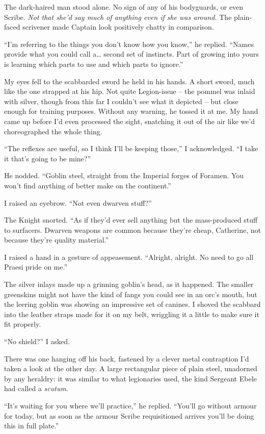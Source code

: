 \documentclass[12pt, openany]{book}
\begin{document}
The dark-haired man stood alone. No sign of any of his bodyguards, or even Scribe. \textit{Not that she’d say much of anything even if she was around.} The plain-faced scrivener made Captain look positively chatty in comparison.

“I’m referring to the things you don’t know how you know,” he replied. “Names provide what you could call a… second set of instincts. Part of growing into yours is learning which parts to use and which parts to ignore.”

My eyes fell to the scabbarded sword he held in his hands. A short sword, much like the one strapped at his hip. Not quite Legion-issue – the pommel was inlaid with silver, though from this far I couldn’t see what it depicted – but close enough for training purposes. Without any warning, he tossed it at me. My hand came up before I’d even processed the sight, snatching it out of the air like we’d choreographed the whole thing.

“The reflexes are useful, so I think I’ll be keeping those,” I acknowledged. “I take it that’s going to be mine?”

He nodded. “Goblin steel, straight from the Imperial forges of Foramen. You won’t find anything of better make on the continent.”

I raised an eyebrow. “Not even dwarven stuff?”

The Knight snorted. “As if they’d ever sell anything but the mass-produced stuff to surfacers. Dwarven weapons are common because they’re cheap, Catherine, not because they’re quality material.”

I raised a hand in a gesture of appeasement. “Alright, alright. No need to go all Praesi pride on me.”

The silver inlays made up a grinning goblin’s head, as it happened. The smaller greenskins might not have the kind of fangs you could see in an orc’s mouth, but the leering goblin was showing an impressive set of canines. I shoved the scabbard into the leather straps made for it on my belt, wriggling it a little to make sure it fit properly.

“No shield?” I asked.

There was one hanging off his back, fastened by a clever metal contraption I’d taken a look at the other day. A large rectangular piece of plain steel, unadorned by any heraldry: it was similar to what legionaries used, the kind Sergeant Ebele had called a \textit{scutum}.

“It’s waiting for you where we’ll practice,” he replied. “You’ll go without armour for today, but as soon as the armour Scribe requisitioned arrives you’ll be doing this in full plate.”
\end{document}
